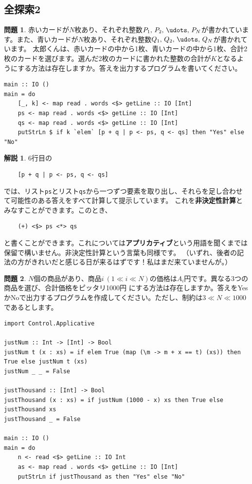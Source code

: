 \documentclass[12pt,a4paper,dvipdfmx,fleqn]{article}%
\theoremstyle{definition}
\newtheorem*{toi*}{問題}
\theoremstyle{definition}
\newtheorem*{ans*}{解説}
\theoremstyle{definition}
\begin{document}
\subsection{全探索2}\label{全探索2}
\begin{toi*}
    赤いカードが$N$枚あり、それぞれ整数$P_1,\,P_2,\,\udots,\,P_N$が書かれています。また、青いカードが$N$枚あり、それぞれ整数$Q_1,\,Q_2,\,\udots,\,Q_N$が書かれています。
    太郎くんは、赤いカードの中から1枚、青いカードの中から1枚、合計2枚のカードを選びます。選んだ2枚のカードに書かれた整数の合計が$K$となるようにする方法は存在しますか。答えを出力するプログラムを書いてください。
\end{toi*}
\begin{lstlisting}[caption=A03.hs,label=A03]
main :: IO ()
main = do
    [_, k] <- map read . words <$> getLine :: IO [Int]
    ps <- map read . words <$> getLine :: IO [Int]
    qs <- map read . words <$> getLine :: IO [Int]
    putStrLn $ if k `elem` [p + q | p <- ps, q <- qs] then "Yes" else "No"
\end{lstlisting}
\begin{ans*}
    6行目の
    \begin{verbatim}
    [p + q | p <- ps, q <- qs]
    \end{verbatim}
    \vspace*{-4mm}
    では、リスト\texttt{ps}とリスト\texttt{qs}から一つずつ要素を取り出し、それらを足し合わせて可能性のある答えをすべて計算して提示しています。
    これを{\bf 非決定性計算}とみなすことができます。このとき、
    \begin{verbatim}
    (+) <$> ps <*> qs
    \end{verbatim}
    \vspace*{-4mm}
    と書くことができます。これについては{\bf アプリカティブ}という用語を聞くまでは保留で構いません。非決定性計算という言葉も同様です。
    （いずれ、後者の記法の方がきれいだと感じる日が来るはずです！私はまだ来ていませんが。）
\end{ans*}
\begin{toi*}
    $N$個の商品があり、商品$i~(1\ll i\ll N)$の価格は$A_i$円です。異なる3つの商品を選び、合計価格をピッタリ1000円
    にする方法は存在しますか。答えをYesかNoで出力するプログラムを作成してください。ただし、制約は$3\ll N\ll 1000$であるとします。
\end{toi*}
\begin{lstlisting}[caption=B03.hs,label=B03]
import Control.Applicative

justNum :: Int -> [Int] -> Bool
justNum t (x : xs) = if elem True (map (\m -> m + x == t) (xs)) then True else justNum t (xs)
justNum _ _ = False

justThousand :: [Int] -> Bool
justThousand (x : xs) = if justNum (1000 - x) xs then True else justThousand xs
justThousand _ = False

main :: IO ()
main = do
    n <- read <$> getLine :: IO Int
    as <- map read . words <$> getLine :: IO [Int]
    putStrLn if justThousand as then "Yes" else "No"
\end{lstlisting}
\end{document}
